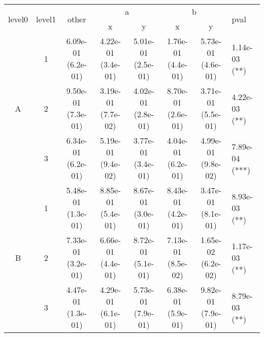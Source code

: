 \begin{tabular}{cccccccl}
\toprule
\multirow{2}{*}{level0} & \multirow{2}{*}{level1}& \multirow{2}{*}{other}&\multicolumn{2}{c}{a}&\multicolumn{2}{c}{b}& \multirow{2}{*}{pval}\tabularnewline
\cmidrule(lr){4-5}
\cmidrule(lr){6-7}
&&&x&y&x&y\tabularnewline
\midrule
\multirow{3}{*}{A}&1& 6.09e-01 (6.2e-01)& 4.22e-01 (3.4e-01)& 5.01e-01 (2.5e-01)& 1.76e-01 (4.4e-01)& 5.73e-01 (4.6e-01)& 1.14e-03 (**)\tabularnewline
&2& 9.50e-01 (7.3e-01)& 3.19e-01 (7.7e-02)& 4.02e-01 (2.8e-01)& 8.70e-01 (2.6e-01)& 3.71e-01 (5.5e-01)& 4.22e-03 (**)\tabularnewline
&3& 6.34e-01 (6.2e-01)& 5.19e-01 (9.4e-02)& 3.77e-01 (3.4e-01)& 4.04e-01 (6.2e-01)& 4.99e-01 (9.8e-02)& 7.89e-04 (***)\tabularnewline
\midrule
\multirow{3}{*}{B}&1& 5.48e-01 (1.3e-01)& 8.85e-01 (5.4e-01)& 8.67e-01 (3.0e-01)& 8.43e-01 (4.2e-01)& 3.47e-01 (8.1e-01)& 8.93e-03 (**)\tabularnewline
&2& 7.33e-01 (3.2e-01)& 6.66e-01 (4.4e-01)& 8.72e-01 (5.1e-01)& 7.13e-01 (8.5e-02)& 1.65e-02 (6.2e-02)& 1.17e-03 (**)\tabularnewline
&3& 4.47e-01 (1.3e-01)& 4.29e-01 (6.1e-01)& 5.73e-01 (7.9e-01)& 6.38e-01 (5.9e-01)& 9.82e-01 (7.9e-01)& 8.79e-03 (**)\tabularnewline
\bottomrule
\end{tabular}
